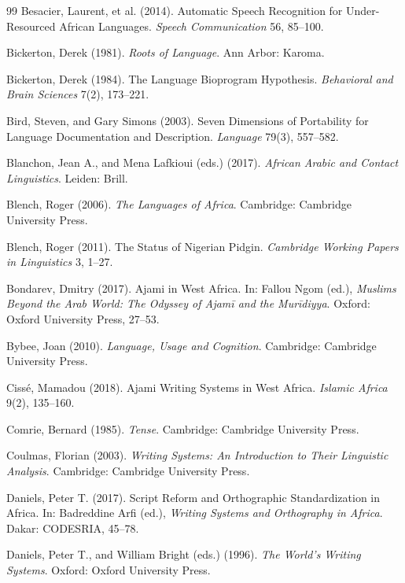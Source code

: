 \documentclass[12pt]{article}
\begin{document}
\begin{thebibliography}{99}
Besacier, Laurent, et al. (2014).
Automatic Speech Recognition for Under-Resourced African Languages.
\textit{Speech Communication} 56, 85--100.

Bickerton, Derek (1981).
\textit{Roots of Language}.
Ann Arbor: Karoma.

Bickerton, Derek (1984).
The Language Bioprogram Hypothesis.
\textit{Behavioral and Brain Sciences} 7(2), 173--221.

Bird, Steven, and Gary Simons (2003).
Seven Dimensions of Portability for Language Documentation and Description.
\textit{Language} 79(3), 557--582.

Blanchon, Jean A., and Mena Lafkioui (eds.) (2017).
\textit{African Arabic and Contact Linguistics}.
Leiden: Brill.

Blench, Roger (2006).
\textit{The Languages of Africa}.
Cambridge: Cambridge University Press.

Blench, Roger (2011).
The Status of Nigerian Pidgin.
\textit{Cambridge Working Papers in Linguistics} 3, 1--27.

Bondarev, Dmitry (2017).
Ajami in West Africa.
In: Fallou Ngom (ed.),
\textit{Muslims Beyond the Arab World: The Odyssey of \textit{Ajam\={i}} and the Mur\={i}diyya}.
Oxford: Oxford University Press, 27--53.

Bybee, Joan (2010).
\textit{Language, Usage and Cognition}.
Cambridge: Cambridge University Press.

Cissé, Mamadou (2018).
Ajami Writing Systems in West Africa.
\textit{Islamic Africa} 9(2), 135--160.

Comrie, Bernard (1985).
\textit{Tense}.
Cambridge: Cambridge University Press.

Coulmas, Florian (2003).
\textit{Writing Systems: An Introduction to Their Linguistic Analysis}.
Cambridge: Cambridge University Press.

Daniels, Peter T. (2017).
Script Reform and Orthographic Standardization in Africa.
In: Badreddine Arfi (ed.),
\textit{Writing Systems and Orthography in Africa}.
Dakar: CODESRIA, 45--78.

Daniels, Peter T., and William Bright (eds.) (1996).
\textit{The World's Writing Systems}.
Oxford: Oxford University Press.


\end{thebibliography}
\end{document}
